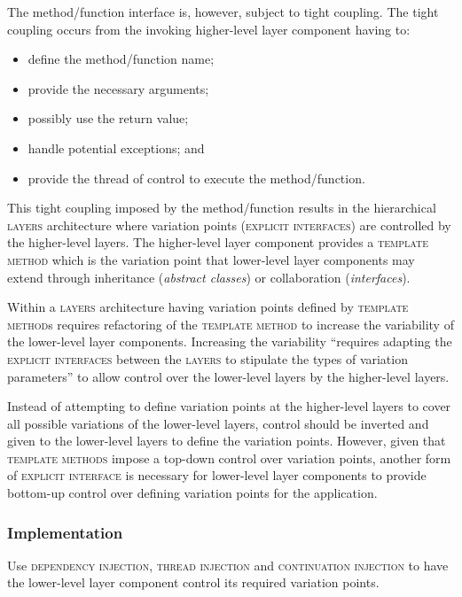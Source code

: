 \documentclass[prodmode]{style/acmlarge}
\begin{document}
The method/function interface is, however, subject to tight coupling.  The tight
coupling occurs from the invoking higher-level layer component having to:
\begin{itemize}
  \item define the method/function name;
  \item provide the necessary arguments;
  \item possibly use the return value;
  \item handle potential exceptions; and
  \item provide the thread of control to execute the method/function.
\end{itemize}

This tight coupling imposed by the method/function results in the hierarchical
\textsc{layers} architecture where variation points (\textsc{explicit
interfaces}) are controlled by the higher-level layers.  The higher-level layer
component provides a \textsc{template method} \cite{gof} which is the variation
point that lower-level layer components may extend through inheritance
(\textit{abstract classes}) or collaboration (\textit{interfaces}).

Within a \textsc{layers} architecture having variation points defined by
\textsc{template method}s requires refactoring of the \textsc{template method}
to increase the variability of the lower-level layer components.  Increasing the
variability ``requires adapting the \textsc{explicit interfaces} between the
\textsc{layers} to stipulate the types of variation parameters'' \cite[p.
5]{ioc} to allow control over the lower-level layers by the higher-level layers.

Instead of attempting to define variation points at the higher-level layers to cover
all possible variations of the lower-level layers, control should be inverted and
given to the lower-level layers to define the variation points.  However, given
that \textsc{template methods} impose a top-down control over variation points,
another form of \textsc{explicit interface} is necessary for lower-level layer
components to provide bottom-up control over defining variation points for the
application.


\subsubsection*{Implementation}

Use \textsc{dependency injection}, \textsc{thread injection} and
\textsc{continuation injection} to have the lower-level layer component control
its required variation points.
\end{document}

